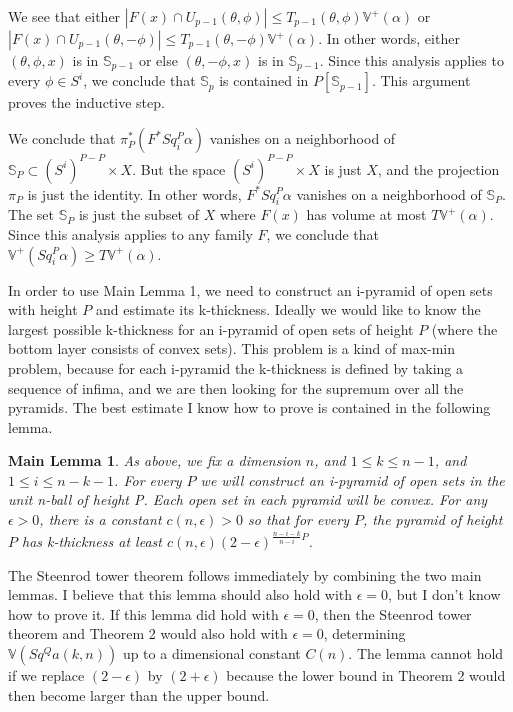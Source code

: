 \documentclass{amsart}
\newtheorem*{Theorem 1}{Theorem 1}
\newtheorem*{Theorem 2}{Theorem 2}
\newtheorem*{Theorem 1A}{Theorem 1A}
\newtheorem*{Theorem 2A}{Theorem 2A}
\newtheorem{ML}{Main Lemma}
\newtheorem*{vanishing lemma}{Vanishing Lemma}
\numberwithin{equation}{section}
\begin{document}
We see that either $|F(x) \cap U_{p-1}(\theta,
\phi)| \le T_{p-1}(\theta, \phi) \mathbb{V}^+(\alpha)$ or $|F(x)
\cap U_{p-1}(\theta, - \phi)| \le T_{p-1}(\theta, - \phi)
\mathbb{V}^+(\alpha)$. In other words, either $(\theta, \phi, x)$ is in $\mathbb{S}_{p-1}$ or else
$(\theta, - \phi, x)$ is in $\mathbb{S}_{p-1}$.  Since this
analysis applies to every $\phi \in S^i$, we conclude that 
$\mathbb{S}_p$ is contained in $P[\mathbb{S}_{p-1}]$.  This
argument proves the inductive step.

We conclude that $\pi_P^* (F^* Sq_i^P \alpha)$ vanishes on
a neighborhood of $\mathbb{S}_P \subset (S^i)^{P-P} \times X$.
But the space $(S^i)^{P-P} \times X$ is just $X$, and the
projection $\pi_P$ is just the identity.  In other words,
$F^* Sq_i^P \alpha$ vanishes on a neighborhood of $\mathbb{S}_P$.
The set $\mathbb{S}_P$ is just the subset of $X$ where $F(x)$
has volume at most $T \mathbb{V}^+(\alpha)$.  Since this analysis
applies to any family $F$, we conclude that $\mathbb{V}^+(Sq_i^P \alpha)
\ge T \mathbb{V}^+(\alpha)$. \endproof

In order to use Main Lemma 1, we need to construct an i-pyramid of
open sets with height $P$ and estimate its k-thickness.  
Ideally we would like
to know the largest possible k-thickness for an i-pyramid of open
sets of height $P$ (where the bottom layer consists of convex sets).
This problem is a kind of max-min problem, because for each i-pyramid
the k-thickness is defined by taking a sequence of infima, and we are then
looking for the supremum over all the pyramids.  The best estimate
I know how to prove is contained in the following lemma.

\begin{ML} As above, we fix a dimension $n$, and $1 \le k \le n-1$,
and $1 \le i \le n-k-1$.  For every $P$ we will construct an i-pyramid of open sets in
the unit n-ball of height P.  Each open set in each pyramid will
be convex.  For any $\epsilon > 0$, there is a constant $c(n, \epsilon) > 0$
so that for every $P$, the pyramid of height $P$ has k-thickness
at least $c(n, \epsilon) (2 - \epsilon)^{\frac{n-i-k}{n-i} P}$.
\end{ML}

The Steenrod tower theorem follows immediately by combining the 
two main lemmas.  I believe that this lemma should also hold with
$\epsilon = 0$, but I don't know how to prove it.  If this lemma did hold
with $\epsilon = 0$, then the Steenrod tower theorem and Theorem 2 would
also hold with $\epsilon = 0$, determining $\mathbb{V}(Sq^Q a(k,n))$ up to 
a dimensional constant $C(n)$.  The lemma cannot hold if
we replace $(2 - \epsilon)$ by $(2 + \epsilon)$ because the lower bound
in Theorem 2 would then become larger than the upper bound.
\end{document}
